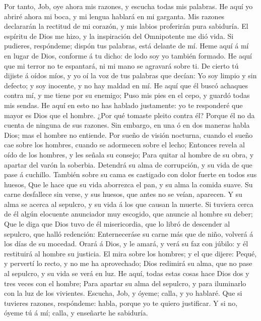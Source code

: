  Por tanto, Job, oye ahora mis razones, y escucha todas
mis palabras.  He aquí yo abriré ahora mi boca, y mi
lengua hablará en mi garganta.  Mis razones declararán la
rectitud de mi corazón, y mis labios proferirán pura sabiduría.
 El espíritu de Dios me hizo, y la inspiración del
Omnipotente me dió vida.  Si pudieres, respóndeme; dispón
tus palabras, está delante de mí.  Heme aquí á mí en lugar
de Dios, conforme á tu dicho: de lodo soy yo también formado.
 He aquí que mi terror no te espantará, ni mi mano se
agravará sobre ti.  De cierto tú dijiste á oídos míos, y
yo oí la voz de tus palabras que decían:  Yo soy limpio y
sin defecto; y soy inocente, y no hay maldad en mí.  He
aquí que él buscó achaques contra mí, y me tiene por su enemigo;
 Puso mis pies en el cepo, y guardó todas mis sendas.
 He aquí en esto no has hablado justamente: yo te
responderé que mayor es Dios que el hombre.  ¿Por qué
tomaste pleito contra él? Porque él no da cuenta de ninguna de sus
razones.  Sin embargo, en una ó en dos maneras habla
Dios; mas el hombre no entiende.  Por sueño de visión
nocturna, cuando el sueño cae sobre los hombres, cuando se adormecen
sobre el lecho;  Entonces revela al oído de los hombres,
y les señala su consejo;  Para quitar al hombre de su
obra, y apartar del varón la soberbia.  Detendrá su alma
de corrupción, y su vida de que pase á cuchillo.  También
sobre su cama es castigado con dolor fuerte en todos sus huesos,
 Que le hace que su vida aborrezca el pan, y su alma la
comida suave.  Su carne desfallece sin verse, y sus
huesos, que antes no se veían, aparecen.  Y su alma se
acerca al sepulcro, y su vida á los que causan la muerte.
 Si tuviera cerca de él algún elocuente anunciador muy
escogido, que anuncie al hombre su deber;  Que le diga
que Dios tuvo de él misericordia, que lo libró de descender al sepulcro,
que halló redención:  Enterneceráse su carne más que de
niño, volverá á los días de su mocedad.  Orará á Dios, y
le amará, y verá su faz con júbilo: y él restituirá al hombre su
justicia.  El mira sobre los hombres; y el que dijere:
Pequé, y pervertí lo recto, y no me ha aprovechado;  Dios
redimirá su alma, que no pase al sepulcro, y su vida se verá en luz.
 He aquí, todas estas cosas hace Dios dos y tres veces
con el hombre;  Para apartar su alma del sepulcro, y para
iluminarlo con la luz de los vivientes.  Escucha, Job, y
óyeme; calla, y yo hablaré.  Que si tuvieres razones,
respóndeme: habla, porque yo te quiero justificar.  Y si
no, óyeme tú á mí; calla, y enseñarte he sabiduría.

